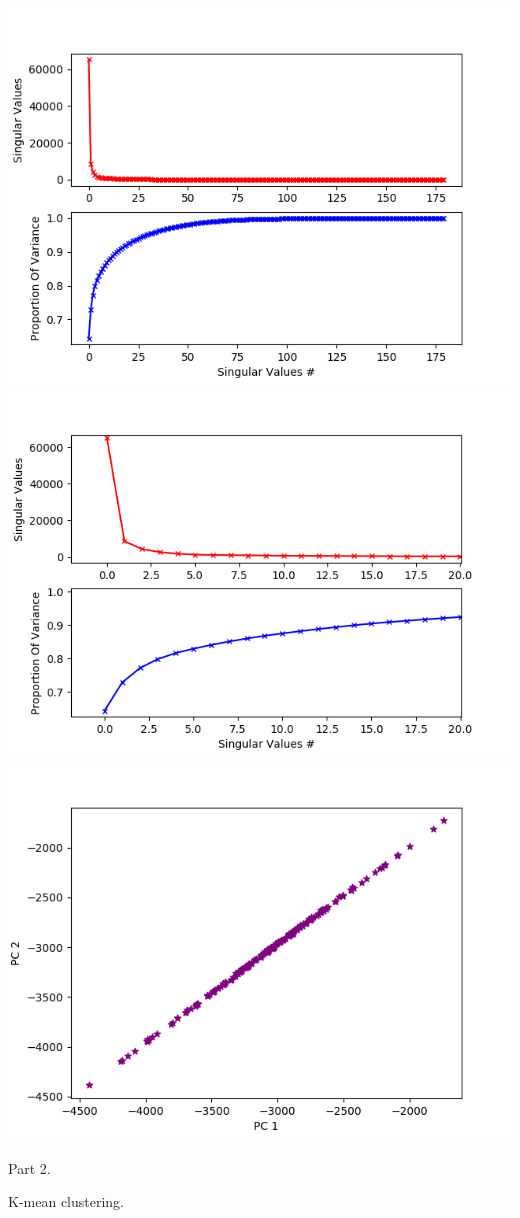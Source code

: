 \documentclass[12pt, letterpaper]{article}
\begin{document}
\begin{enumerate}[label=\Roman*.]
	\includegraphics[width=\linewidth]{scree.png} \\
	\includegraphics[width=\linewidth]{kpcs.png} \\
	\includegraphics[width=\linewidth]{ScatterPCs.png} \\
	{\bf \item Part 2.} K-mean clustering. \\
\end{enumerate}
	
\end{document}
